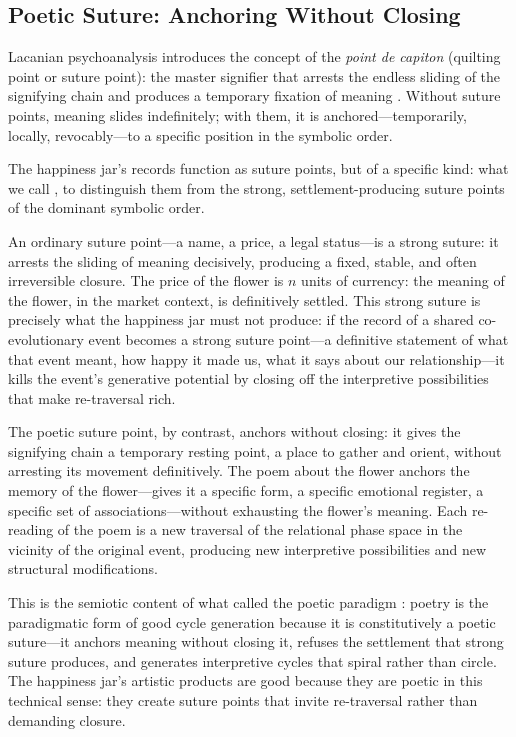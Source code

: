 \subsection{Poetic Suture: Anchoring Without Closing}
\label{p15:subsec:suture}

\noindent
Lacanian psychoanalysis introduces the concept of the \emph{point de capiton} (quilting point or suture point): the master signifier that arrests the endless sliding of the signifying chain and produces a temporary fixation of meaning \parencite{lacan2006}. Without suture points, meaning slides indefinitely; with them, it is anchored---temporarily, locally, revocably---to a specific position in the symbolic order.

The happiness jar's records function as suture points, but of a specific kind: what we call , to distinguish them from the strong, settlement-producing suture points of the dominant symbolic order.

An ordinary suture point---a name, a price, a legal status---is a strong suture: it arrests the sliding of meaning decisively, producing a fixed, stable, and often irreversible closure. The price of the flower is $n$ units of currency: the meaning of the flower, in the market context, is definitively settled. This strong suture is precisely what the happiness jar must not produce: if the record of a shared co-evolutionary event becomes a strong suture point---a definitive statement of what that event meant, how happy it made us, what it says about our relationship---it kills the event's generative potential by closing off the interpretive possibilities that make re-traversal rich.

The poetic suture point, by contrast, anchors without closing: it gives the signifying chain a temporary resting point, a place to gather and orient, without arresting its movement definitively. The poem about the flower anchors the memory of the flower---gives it a specific form, a specific emotional register, a specific set of associations---without exhausting the flower's meaning. Each re-reading of the poem is a new traversal of the relational phase space in the vicinity of the original event, producing new interpretive possibilities and new structural modifications.

This is the semiotic content of what  called the poetic paradigm \parencite{paperix}: poetry is the paradigmatic form of good cycle generation because it is constitutively a poetic suture---it anchors meaning without closing it, refuses the settlement that strong suture produces, and generates interpretive cycles that spiral rather than circle. The happiness jar's artistic products are good because they are poetic in this technical sense: they create suture points that invite re-traversal rather than demanding closure.

